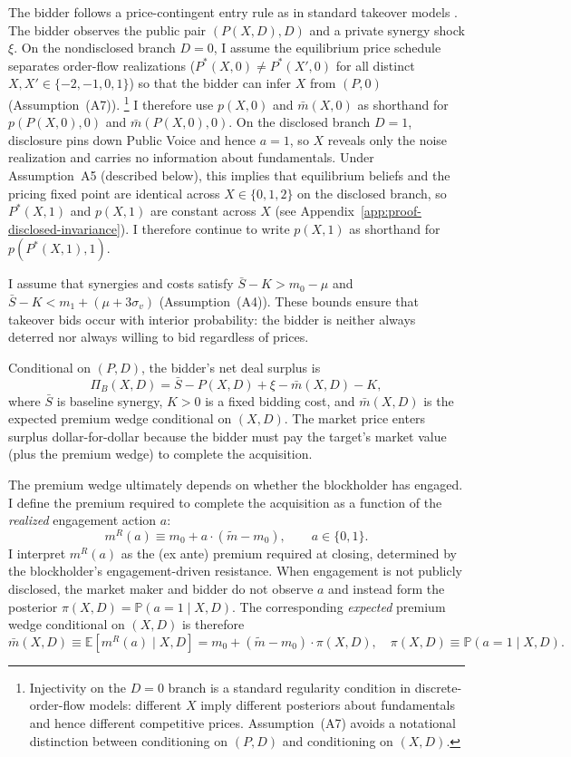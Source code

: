 \documentclass[11pt]{article}
\newcommand{\E}{\mathbb{E}}
\newcommand{\PP}{\mathbb{P}}
\newcommand{\1}{\mathbf{1}}
\begin{document}
The bidder follows a price-contingent entry rule as in standard takeover models \citep{GrossmanHart1980,Fishman1988,BulowHuangKlemperer1999,EdmansGoldsteinJiang2012}. The bidder observes the public pair $(P(X,D), D)$ and a private synergy shock $\xi$. On the nondisclosed branch $D=0$, I assume the equilibrium price schedule separates order-flow realizations ($P^*(X,0) \neq P^*(X',0)$ for all distinct $X, X' \in \{-2,-1,0,1\}$) so that the bidder can infer $X$ from $(P,0)$ (Assumption~\textup{(A7)}).%
\footnote{Injectivity on the $D=0$ branch is a standard regularity condition in discrete-order-flow models: different $X$ imply different posteriors about fundamentals and hence different competitive prices. Assumption~\textup{(A7)} avoids a notational distinction between conditioning on $(P,D)$ and conditioning on $(X,D)$.}
I therefore use $p(X,0)$ and $\bar{m}(X,0)$ as shorthand for $p(P(X,0),0)$ and $\bar{m}(P(X,0),0)$. On the disclosed branch $D=1$, disclosure pins down Public Voice and hence $a=1$, so $X$ reveals only the noise realization and carries no information about fundamentals. Under Assumption~A5 (described below), this implies that equilibrium beliefs and the pricing fixed point are identical across $X\in\{0,1,2\}$ on the disclosed branch, so $P^*(X,1)$ and $p(X,1)$ are constant across $X$ (see Appendix~\ref{app:proof-disclosed-invariance}). I therefore continue to write $p(X,1)$ as shorthand for $p(P^*(X,1),1)$.

I assume that synergies and costs satisfy $\bar{S}-K > m_0-\mu$ and $\bar{S}-K < m_1+(\mu+3\sigma_v)$ (Assumption~\textup{(A4)}). These bounds ensure that takeover bids occur with interior probability: the bidder is neither always deterred nor always willing to bid regardless of prices.

Conditional on $(P,D)$, the bidder's net deal surplus is
\[
\Pi_B(X,D) = \bar{S} - P(X,D) + \xi - \bar{m}(X,D) - K,
\]
where $\bar{S}$ is baseline synergy, $K > 0$ is a fixed bidding cost, and $\bar{m}(X,D)$ is the expected premium wedge conditional on $(X,D)$. The market price enters surplus dollar-for-dollar because the bidder must pay the target's market value (plus the premium wedge) to complete the acquisition.

The premium wedge ultimately depends on whether the blockholder has engaged. I define the premium required to complete the acquisition as a function of the \emph{realized} engagement action $a$:
\[
m^{R}(a) \equiv m_0 + a\cdot(\tilde{m}-m_0), \qquad a\in\{0,1\}.
\]
I interpret $m^{R}(a)$ as the (ex ante) premium required at closing, determined by the blockholder's engagement-driven resistance.
When engagement is not publicly disclosed, the market maker and bidder do not observe $a$ and instead form the posterior $\pi(X,D)=\PP(a=1 \mid X,D)$. The corresponding \emph{expected} premium wedge conditional on $(X,D)$ is therefore
\[
\bar{m}(X,D) \equiv \E[m^{R}(a) \mid X,D] = m_0 + (\tilde{m} - m_0)\cdot \pi(X,D), \quad \pi(X,D) \equiv \PP(a = 1 \mid X, D).
\]
\end{document}

